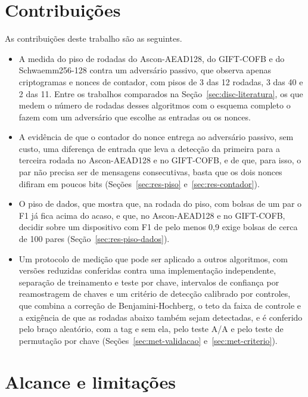 \section{Contribuições}
\label{sec:conc-contribuicoes}

As contribuições deste trabalho são as seguintes.
\begin{itemize}
\item A medida do piso de rodadas do Ascon-AEAD128, do GIFT-COFB e do Schwaemm256-128 contra um adversário passivo, que observa apenas criptogramas e nonces de contador, com pisos de 3 das 12 rodadas, 3 das 40 e 2 das 11. Entre os trabalhos comparados na Seção~\ref{sec:disc-literatura}, os que medem o número de rodadas desses algoritmos com o esquema completo o fazem com um adversário que escolhe as entradas ou os nonces.
\item A evidência de que o contador do nonce entrega ao adversário passivo, sem custo, uma diferença de entrada que leva a detecção da primeira para a terceira rodada no Ascon-AEAD128 e no GIFT-COFB, e de que, para isso, o par não precisa ser de mensagens consecutivas, basta que os dois nonces difiram em poucos bits (Seções~\ref{sec:res-piso} e~\ref{sec:res-contador}).
\item O piso de dados, que mostra que, na rodada do piso, com bolsas de um par o F1 já fica acima do acaso, e que, no Ascon-AEAD128 e no GIFT-COFB, decidir sobre um dispositivo com F1 de pelo menos 0,9 exige bolsas de cerca de 100 pares (Seção~\ref{sec:res-piso-dados}).
\item Um protocolo de medição que pode ser aplicado a outros algoritmos, com versões reduzidas conferidas contra uma implementação independente, separação de treinamento e teste por chave, intervalos de confiança por reamostragem de chaves e um critério de detecção calibrado por controles, que combina a correção de Benjamini-Hochberg, o teto da faixa de controle e a exigência de que as rodadas abaixo também sejam detectadas, e é conferido pelo braço aleatório, com a tag e sem ela, pelo teste A/A e pelo teste de permutação por chave (Seções~\ref{sec:met-validacao} e~\ref{sec:met-criterio}).
\end{itemize}

\section{Alcance e limitações}
\label{sec:conc-alcance}


